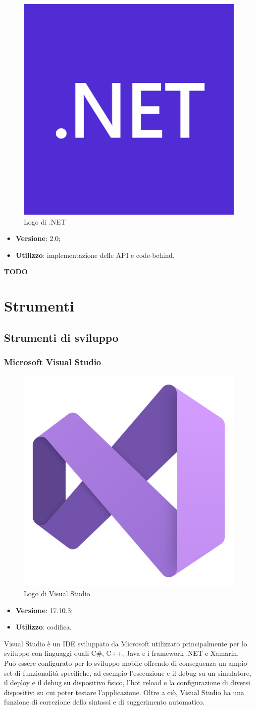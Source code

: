 \begin{figure}[H]
    \centering 
    \includegraphics[width=0.2\columnwidth]{images/loghi/Microsoft_.NET_logo.png} 
    \caption{Logo di .NET}
\end{figure}

\begin{itemize}
    \item \textbf{Versione}: 2.0;
    \item \textbf{Utilizzo}: implementazione delle \gls{API} e \gls{code-behind}.
\end{itemize}

\textbf{TODO}

\section{Strumenti}

\subsection{Strumenti di sviluppo}

\subsubsection{Microsoft Visual Studio}

\begin{figure}[H]
    \centering 
    \includegraphics[width=0.3\columnwidth]{images/loghi/Visual_Studio.png} 
    \caption{Logo di Visual Studio}
\end{figure}

\begin{itemize}
    \item \textbf{Versione}: 17.10.3;
    \item \textbf{Utilizzo}: codifica.
\end{itemize}
Visual Studio è un IDE sviluppato da Microsoft utilizzato principalmente per lo sviluppo con linguaggi quali C\#, C++, Java e i framework .NET e Xamarin.\\
Può essere configurato per lo sviluppo mobile offrendo di conseguenza un ampio set di funzionalità specifiche, ad esempio l'esecuzione e il debug su un simulatore, il deploy e il debug su dispositivo fisico, l'hot reload e la configurazione di diversi dispositivi su cui poter testare l'applicazione. Oltre a ciò, Visual Studio ha una funzione di correzione della sintassi e di suggerimento automatico.

